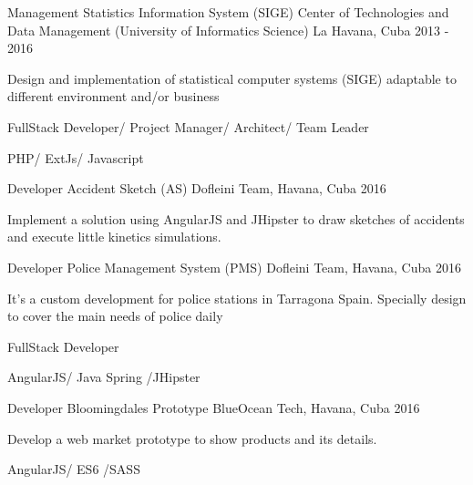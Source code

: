 \begin{cventries}

\cventry
{Management Statistics Information System (SIGE)} %
{Center of Technologies and Data Management (University of Informatics Science)} %
{La Havana, Cuba} %
{2013 - 2016} %
{ %
\begin{cvitems}
\item {Design and implementation of statistical computer systems (SIGE) adaptable to different environment and/or business}
\item {FullStack Developer/ Project Manager/ Architect/ Team Leader}
\item {PHP/ ExtJs/ Javascript}
\end{cvitems}
}


\cventry
{Developer} %
{Accident Sketch (AS)} %
{Dofleini Team, Havana, Cuba} %
{2016} %
{ %
\begin{cvitems}
\item {Implement a solution using AngularJS and JHipster to draw sketches of accidents and execute little kinetics simulations.}
\end{cvitems}
}


\cventry
{Developer} %
{Police Management System (PMS)} %
{Dofleini Team, Havana, Cuba} %
{2016} %
{ %
\begin{cvitems}
\item {It’s a custom development for police stations in Tarragona Spain. Specially design to cover the main needs of police daily}
\item {FullStack Developer}
\item {AngularJS/ Java Spring /JHipster}
\end{cvitems}
}


\cventry
{Developer} %
{Bloomingdales Prototype} %
{BlueOcean Tech, Havana, Cuba} %
{2016} %
{ %
\begin{cvitems}
\item {Develop a web market prototype to show products and its details.}
\item {AngularJS/ ES6 /SASS}
\end{cvitems}
}


\end{cventries}
